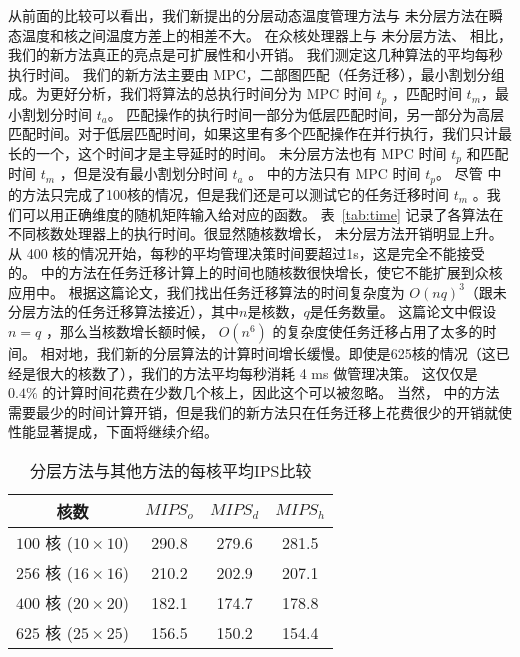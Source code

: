 从前面的比较可以看出，我们新提出的分层动态温度管理方法与 未分层方法在瞬态温度和核之间温度方差上的相差不大。
 在众核处理器上与 未分层方法、 \cite{Hanumaiah:TCAD'11}相比，我们的新方法真正的亮点是可扩展性和小开销。
 我们测定这几种算法的平均每秒执行时间。
 我们的新方法主要由 MPC，二部图匹配（任务迁移），最小割划分组成。为更好分析，我们将算法的总执行时间分为 MPC 时间 $t_p$ ，匹配时间 $t_m$，最小割划分时间 $t_a$。
 匹配操作的执行时间一部分为低层匹配时间，另一部分为高层匹配时间。对于低层匹配时间，如果这里有多个匹配操作在并行执行，我们只计最长的一个，这个时间才是主导延时的时间。
 未分层方法也有 MPC 时间 $t_p$ 和匹配时间 $t_m$ ，但是没有最小割划分时间 $t_a$ 。
\cite{Zanini:ECCTD'09} 中的方法只有 MPC 时间 $t_p$。
 尽管 \cite{Hanumaiah:TCAD'11} 中的方法只完成了100核的情况，但是我们还是可以测试它的任务迁移时间 $t_m$ 。我们可以用正确维度的随机矩阵输入给对应的函数。
 表~\ref{tab:time} 记录了各算法在不同核数处理器上的执行时间。很显然随核数增长， 未分层方法开销明显上升。
 从 400 核的情况开始，每秒的平均管理决策时间要超过1s，这是完全不能接受的。
 \cite{Hanumaiah:TCAD'11} 中的方法在任务迁移计算上的时间也随核数很快增长，使它不能扩展到众核应用中。
 根据这篇论文，我们找出任务迁移算法的时间复杂度为 $O(nq)^3$（跟未分层方法的任务迁移算法接近），其中$n$是核数，$q$是任务数量。
 这篇论文中假设 $n=q$ ，那么当核数增长额时候， $O(n^6)$ 的复杂度使任务迁移占用了太多的时间。
 相对地，我们新的分层算法的计算时间增长缓慢。即使是625核的情况（这已经是很大的核数了），我们的方法平均每秒消耗 4 ms 做管理决策。
 这仅仅是 $0.4\%$ 的计算时间花费在少数几个核上，因此这个可以被忽略。
 当然，\cite{Zanini:ECCTD'09} 中的方法需要最少的时间计算开销，但是我们的新方法只在任务迁移上花费很少的开销就使性能显著提成，下面将继续介绍。

   

\begin{table}
\centering
 \caption{分层方法与其他方法的每核平均IPS比较 \label{tab:ips}}{
 \begin{tabular}{|c|c|c|c|}
 \hline
 \hline
 核数  &$MIPS_o$ & $MIPS_d$  & $MIPS_h$ \\%
 \hline 
 \hline
 $100$ 核 ($10 \times 10$) & 290.8 & 279.6 & 281.5 \\%
 \hline
 $256$ 核 ($16 \times 16$) & 210.2 & 202.9 & 207.1 \\%
 \hline
 $400$ 核 ($20 \times 20$) & 182.1 & 174.7 & 178.8 \\%
 \hline
 $625$ 核 ($25 \times 25$) & 156.5 & 150.2 & 154.4 \\%
 \hline
 \hline
 \end{tabular}}
 \end{table}
 
